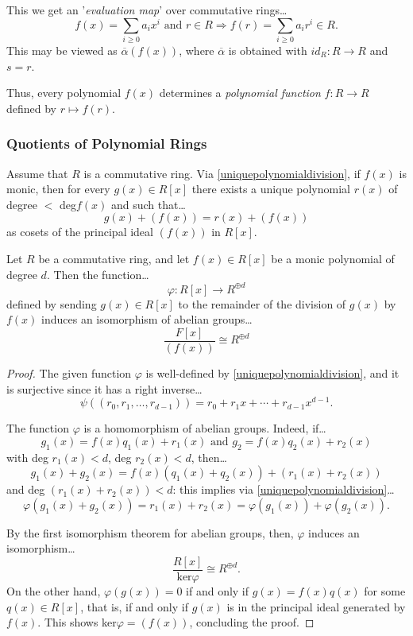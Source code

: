 \noindent This we get an '\emph{evaluation map}' over commutative rings\dots
$$f(x) = \sum_{i \geq 0} a_i x^i \textrm{ and } r \in R \Rightarrow f(r) = \sum_{i \geq 0} a_i r^i \in R.$$
This may be viewed as $\overline{\alpha}(f(x))$, where $\overline{\alpha}$ is obtained with $id_R : R \rightarrow R$ and $s = r$.\newline

\noindent Thus, every polynomial $f(x)$ determines a \emph{polynomial function}\label{polynomialfunction} $f : R \rightarrow R$ defined by $r \mapsto f(r)$.

\subsubsection{Quotients of Polynomial Rings}\label{quotientsofpolynomialrings}
Assume that $R$ is a commutative ring. Via \ref{uniquepolynomialdivision}, if $f(x)$ is monic, then for every $g(x) \in R[x]$ there exists a unique polynomial $r(x)$
of degree $<$ deg$f(x)$ and such that\dots
$$g(x) + (f(x)) = r(x) + (f(x))$$
as cosets of the principal ideal $(f(x))$ in $R[x]$.

\begin{proposition}
Let $R$ be a commutative ring, and let $f(x) \in R[x]$ be a monic polynomial of degree $d$. Then the function\dots
$$\varphi : R[x] \rightarrow R^{\oplus d}$$
defined by sending $g(x) \in R[x]$ to the remainder of the division of $g(x)$ by $f(x)$ induces an isomorphism of abelian
groups\dots
$$\frac{F[x]}{(f(x))} \cong R^{\oplus d}$$
\end{proposition}

\begin{proof}
The given function $\varphi$ is well-defined by \ref{uniquepolynomialdivision}, and it is surjective since it has a right inverse\dots
$$\psi((r_0,r_1,\dots,r_{d-1}))=r_0 + r_1x + \cdots + r_{d-1}x^{d-1}.$$

The function $\varphi$ is a homomorphism of abelian groups. Indeed, if\dots
$$g_1(x) = f(x)q_1(x) + r_1(x) \textrm{ and } g_2 = f(x)q_2(x) + r_2(x)$$
with deg $r_1(x) < d$, deg $r_2(x) < d$, then\dots
$$g_1(x)+g_2(x) = f(x)(q_1(x) + q_2(x)) + (r_1(x) + r_2(x))$$
and deg $(r_1(x) + r_2(x)) < d$: this implies via \ref{uniquepolynomialdivision}\dots
$$\varphi(g_1(x) + g_2(x)) = r_1(x) + r_2(x) = \varphi(g_1(x)) + \varphi(g_2(x)).$$

By the first isomorphism theorem for abelian groups, then, $\varphi$ induces an isomorphism\dots
$$\frac{R[x]}{\textrm{ker}\varphi} \cong R^{\oplus d}.$$
On the other hand, $\varphi(g(x)) = 0$ if and only if $g(x) = f(x)q(x)$ for some $q(x) \in R[x]$,
that is, if and only if $g(x)$ is in the principal ideal generated by $f(x)$. This shows ker$\varphi = (f(x))$,
concluding the proof.
\end{proof}